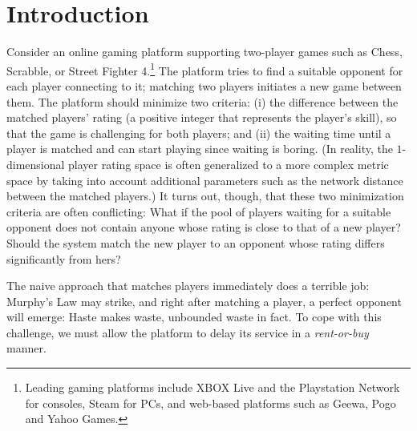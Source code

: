 \documentclass[11pt]{article}
\theoremstyle{definition}
\theoremstyle{plain}
\theoremstyle{definition}
\theoremstyle{plain}
\theoremstyle{definition}
\theoremstyle{plain}
\begin{document}

\section{Introduction}
\label{section:introduction}
Consider an online gaming platform supporting two-player games such as Chess,
Scrabble, or Street Fighter 4.\footnote{%
Leading gaming platforms include XBOX Live and the Playstation Network for
consoles, Steam for PCs, and web-based platforms such as Geewa, Pogo and Yahoo
Games.}
The platform tries to find a suitable opponent for each player connecting to
it;
matching two players initiates a new game between them.
The platform should minimize two criteria:
(i) the difference between the matched players' rating (a positive integer
that represents the player's skill), so that the game is challenging for both
players; and
(ii) the waiting time until a player is matched and can start playing since
waiting is boring.
(In reality, the $1$-dimensional player rating space is often generalized to a
more complex metric space by taking into account additional parameters such as
the network distance between the matched players.)
It turns out, though, that these two minimization criteria are often
conflicting:
What if the pool of players waiting for a suitable opponent does not contain
anyone whose rating is close to that of a new player?
Should the system match the new player to an opponent whose rating differs
significantly from hers?

The naive approach that matches players immediately does
a terrible job:
Murphy's Law may strike, and right after matching a player, a perfect opponent
will emerge:
Haste makes waste, unbounded waste in fact.
To cope with this challenge, we must allow the platform to delay its
service in a \emph{rent-or-buy} manner.

\end{document}
